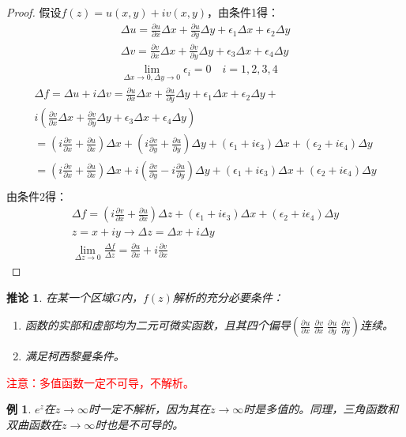 \documentclass[10pt, a4paper, oneside]{ctexbook}
\newtheorem{corollary}[theorem]{推论}
\newtheorem{example}[theorem]{例}
\newcommand{\partdev}[3][]
{\ensuremath{\frac{\displaystyle \partial^{#1} #2}{ \displaystyle \partial #3}}}
\begin{document}
\begin{proof}
    假设$f(z)=u(x,y)+iv(x,y)$，由条件1得：
    \begin{align*}
        \Delta u=\frac{\partial u}{\partial x}\Delta x+\frac{\partial u}{\partial y}\Delta y+\epsilon_1\Delta x+\epsilon_2 \Delta y \\
        \Delta v=\frac{\partial v}{\partial x}\Delta x+\frac{\partial v}{\partial y}\Delta y+\epsilon_3\Delta x+\epsilon_4 \Delta y \\
        \lim_{ \Delta x \to 0, \Delta y \to 0}  \epsilon_i =0 \quad i=1,2,3,4
    \end{align*}
    \begin{align*}
        \Delta f=\Delta u + i \Delta v=\frac{\partial u}{\partial x}\Delta x+\frac{\partial u}{\partial y}\Delta y+\epsilon_1\Delta x+\epsilon_2 \Delta y+\\
        i\left( \frac{\partial v}{\partial x}\Delta x+\frac{\partial v}{\partial y}\Delta y+\epsilon_3\Delta x+\epsilon_4 \Delta y \right)\\
        =\left(i\frac{\partial v}{\partial x}+\frac{\partial u}{\partial x}\right) \Delta x + \left(i\frac{\partial v}{\partial y}+\frac{\partial u}{\partial y}\right) \Delta y  +(\epsilon_1+i\epsilon_3)\Delta x +(\epsilon_2+i\epsilon_4)\Delta y\\
        =\left(i\frac{\partial v}{\partial x}+\frac{\partial u}{\partial x}\right) \Delta x + i\left(\frac{\partial v}{\partial y}-i\frac{\partial u}{\partial y}\right) \Delta y  +(\epsilon_1+i\epsilon_3)\Delta x +(\epsilon_2+i\epsilon_4)\Delta y\\
    \end{align*} 
    由条件2得：
    \begin{align*}
        \Delta f=\left(i\frac{\partial v}{\partial x}+\frac{\partial u}{\partial x}\right) \Delta z  +(\epsilon_1+i\epsilon_3)\Delta x +(\epsilon_2+i\epsilon_4)\Delta y\\
        z=x+iy\to\Delta z= \Delta x+i\Delta y\\
        \lim_{\Delta z \to 0} \frac{\Delta f}{\Delta z} = \frac{\partial u}{\partial x}+i\frac{\partial v}{\partial x}
    \end{align*}
\end{proof}
\begin{corollary}
    在某一个区域$G$内，$f(z)$解析的充分必要条件：
    \begin{enumerate}
        \item 函数的实部和虚部均为二元可微实函数，且其四个偏导$\left(\displaystyle \partdev{u}{x} \; \partdev{v}{x} \; \partdev{u}{y} \; \partdev{v}{y} \right)$连续。
        \item 满足柯西黎曼条件。
    \end{enumerate}
\end{corollary}
\textcolor{red}{注意：多值函数一定不可导，不解析。}
\begin{example}
    $e^z$在$z\to\infty$时一定不解析，因为其在$z\to\infty$时是多值的。同理，三角函数和双曲函数在$z\to\infty$时也是不可导的。
\end{example}
\end{document}
